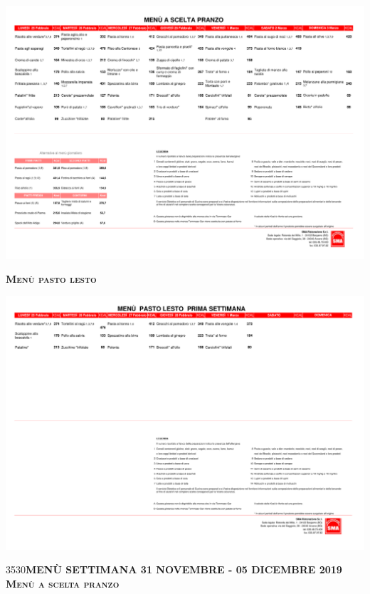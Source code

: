 \documentclass{article}
\makeatletter
\newcommand\HUGE{\@setfontsize\Huge{35}{30}}
\newcommand{\frasetre}{MENÙ SETTIMANA 31 NOVEMBRE - 05 DICEMBRE 2019}
\makeatother
\begin{document}
\includegraphics[trim=0cm 17cm 0cm 2cm,clip,page=4,width=\textwidth,]{scelta.pdf}
\vspace{0.3cm}
\begin{center}
{\Huge \textbf{\textsc{Menù pasto lesto}}}\\
\end{center}
\includegraphics[trim=0cm 23cm 0cm 2cm,clip,page=2,width=\textwidth,]{lesto.pdf}
\newpage
\begin{center}
{\HUGE \color{red}\textbf{\frasetre}}\\
\vspace{0.7cm}
{\Huge \textbf{\textsc{Menù a scelta pranzo}}}\\
\end{center}
\end{document}
